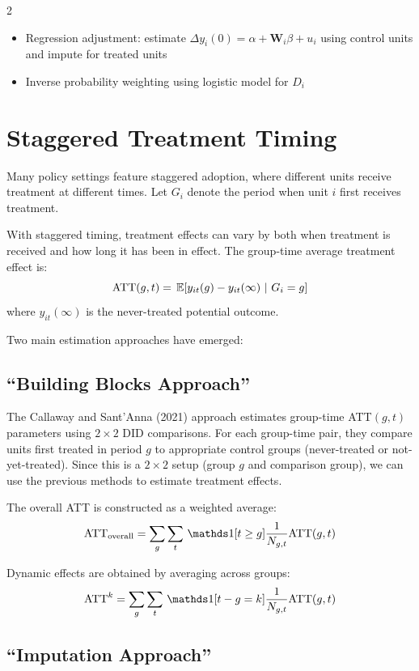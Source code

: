 \documentclass[12pt]{article}
\begin{document}
\begin{multicols}{2}
\begin{itemize}
  \item Regression adjustment: estimate $\Delta y_i(0) = \alpha + \bm{W}_i \beta + u_i$ using control units and impute for treated units
  
  \item Inverse probability weighting using logistic model for $D_i$
\end{itemize}

\newpage
\section*{Staggered Treatment Timing}

Many policy settings feature staggered adoption, where different units receive treatment at different times.
Let $G_i$ denote the period when unit $i$ first receives treatment.

With staggered timing, treatment effects can vary by both when treatment is received and how long it has been in effect.
The group-time average treatment effect is:
$$
  \text{ATT}(g, t) = \expec{y_{it}(g) - y_{it}(\infty)}{G_i = g}
$$
where $y_{it}(\infty)$ is the never-treated potential outcome.

Two main estimation approaches have emerged:

\subsection*{``Building Blocks Approach''}

The Callaway and Sant'Anna (2021) approach estimates group-time ATT$(g,t)$ parameters using $2 \times 2$ DID comparisons.
For each group-time pair, they compare units first treated in period $g$ to appropriate control groups (never-treated or not-yet-treated).
Since this is a $2 \times 2$ setup (group $g$ and comparison group), we can use the previous methods to estimate treatment effects.

The overall ATT is constructed as a weighted average:
$$
  \text{ATT}_{\text{overall}} = \sum_{g} \sum_{t} \one{t \geq g} \frac{1}{N_{g,t}} \text{ATT}(g,t)
$$

Dynamic effects are obtained by averaging across groups:
$$
  \text{ATT}^k = \sum_{g} \sum_{t} \one{t - g = k} \frac{1}{N_{g,t}} \text{ATT}(g,t)
$$

\subsection*{``Imputation Approach''}


\end{multicols}
\end{document}
